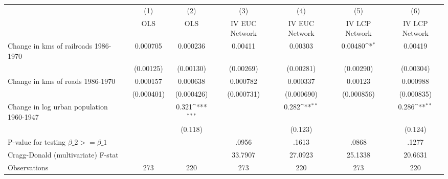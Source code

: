 {
\def\sym#1{\ifmmode^{#1}\else\(^{#1}\)\fi}
\begin{tabular}{l*{6}{c}}
\hline\hline
                &\multicolumn{1}{c}{(1)}&\multicolumn{1}{c}{(2)}&\multicolumn{1}{c}{(3)}&\multicolumn{1}{c}{(4)}&\multicolumn{1}{c}{(5)}&\multicolumn{1}{c}{(6)}\\
                &\multicolumn{1}{c}{OLS}&\multicolumn{1}{c}{OLS}&\multicolumn{1}{c}{IV EUC Network}&\multicolumn{1}{c}{IV EUC Network}&\multicolumn{1}{c}{IV LCP Network}&\multicolumn{1}{c}{IV LCP Network}\\
\hline
Change in kms of railroads 1986-1970& 0.000705         & 0.000236         &  0.00411         &  0.00303         &  0.00480\sym{*}  &  0.00419         \\
                &(0.00125)         &(0.00130)         &(0.00269)         &(0.00281)         &(0.00290)         &(0.00304)         \\
[1em]
Change in kms of roads 1986-1970& 0.000157         & 0.000638         & 0.000782         & 0.000337         &  0.00123         & 0.000988         \\
                &(0.000401)         &(0.000426)         &(0.000731)         &(0.000690)         &(0.000856)         &(0.000835)         \\
[1em]
Change in log urban population 1960-1947&                  &    0.321\sym{***}&                  &    0.282\sym{**} &                  &    0.286\sym{**} \\
                &                  &  (0.118)         &                  &  (0.123)         &                  &  (0.124)         \\
\hline
P-value for testing $\beta\_{2} >= \beta\_{1}$&                  &                  &    .0956         &    .1613         &    .0868         &    .1277         \\
Cragg-Donald (multivariate) F-stat&                  &                  &  33.7907         &  27.0923         &  25.1338         &  20.6631         \\
Observations    &      273         &      220         &      273         &      220         &      273         &      220         \\
\hline\hline
\end{tabular}
}
